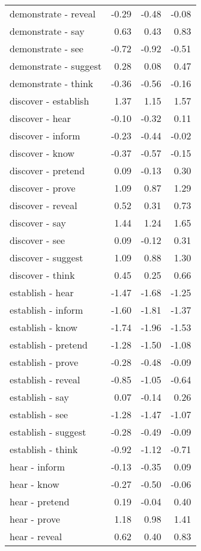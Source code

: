 \begin{longtable}{lrrr}
  demonstrate - reveal & -0.29 & -0.48 & -0.08 \\ 
  demonstrate - say & 0.63 & 0.43 & 0.83 \\ 
  demonstrate - see & -0.72 & -0.92 & -0.51 \\ 
  demonstrate - suggest & 0.28 & 0.08 & 0.47 \\ 
  demonstrate - think & -0.36 & -0.56 & -0.16 \\ 
  discover - establish & 1.37 & 1.15 & 1.57 \\ 
  discover - hear & -0.10 & -0.32 & 0.11 \\ 
  discover - inform & -0.23 & -0.44 & -0.02 \\ 
  discover - know & -0.37 & -0.57 & -0.15 \\ 
  discover - pretend & 0.09 & -0.13 & 0.30 \\ 
  discover - prove & 1.09 & 0.87 & 1.29 \\ 
  discover - reveal & 0.52 & 0.31 & 0.73 \\ 
  discover - say & 1.44 & 1.24 & 1.65 \\ 
  discover - see & 0.09 & -0.12 & 0.31 \\ 
  discover - suggest & 1.09 & 0.88 & 1.30 \\ 
  discover - think & 0.45 & 0.25 & 0.66 \\ 
  establish - hear & -1.47 & -1.68 & -1.25 \\ 
  establish - inform & -1.60 & -1.81 & -1.37 \\ 
  establish - know & -1.74 & -1.96 & -1.53 \\ 
  establish - pretend & -1.28 & -1.50 & -1.08 \\ 
  establish - prove & -0.28 & -0.48 & -0.09 \\ 
  establish - reveal & -0.85 & -1.05 & -0.64 \\ 
  establish - say & 0.07 & -0.14 & 0.26 \\ 
  establish - see & -1.28 & -1.47 & -1.07 \\ 
  establish - suggest & -0.28 & -0.49 & -0.09 \\ 
  establish - think & -0.92 & -1.12 & -0.71 \\ 
  hear - inform & -0.13 & -0.35 & 0.09 \\ 
  hear - know & -0.27 & -0.50 & -0.06 \\ 
  hear - pretend & 0.19 & -0.04 & 0.40 \\ 
  hear - prove & 1.18 & 0.98 & 1.41 \\ 
  hear - reveal & 0.62 & 0.40 & 0.83 \\ 

\end{longtable}

